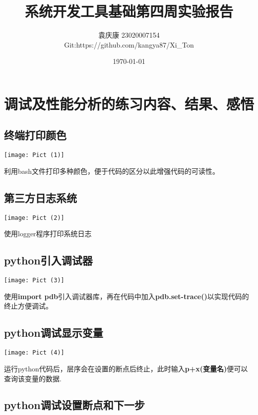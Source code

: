 \documentclass[a4paper, 12pt]{article}
\begin{document}
\title{\textbf{系统开发工具基础第四周实验报告}}
\author{袁庆康 23020007154 \\Git:https://github.com/kangya87/Xi\_Ton}
\date{\today}
\maketitle

\tableofcontents
\newpage
{}

\section{\large 调试及性能分析的练习内容、结果、感悟}
\subsection{\small 终端打印颜色}

\texttt{[image: Pict (1)]}

利用bash文件打印多种颜色，便于代码的区分以此增强代码的可读性。

\subsection{\small 第三方日志系统}

\texttt{[image: Pict (2)]}

使用logger程序打印系统日志


\subsection{\small python引入调试器}

\texttt{[image: Pict (3)]}

使用\textbf{import pdb}引入调试器库，再在代码中加入\textbf{pdb.set-trace()}以实现代码的终止方便调试。

\subsection{\small python调试显示变量}

\texttt{[image: Pict (4)]}

运行python代码后，层序会在设置的断点后终止，此时输入\textbf{p+x(变量名)}便可以查询该变量的数据.

\subsection{\small python调试设置断点和下一步}
\end{document}
